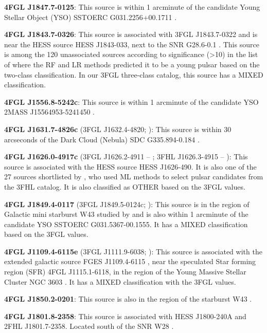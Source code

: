 \documentclass[referee]{aa} %
\begin{document}
\textbf{4FGL J1847.7-0125}: This source is within 1 arcminute of the candidate Young Stellar Object (YSO) SSTOERC G031.2256+00.1711 \citep{2017ApJ...839..108S}.

\textbf{4FGL J1843.7-0326}: This source is associated with 3FGL J1843.7-0322 and is near the HESS source HESS J1843-033, next to the SNR G28.6-0.1 \citep{2018A&A...612A...1H}. This source is
among the 120 unassociated sources according to significance (>10) in the list of \citet{2016ApJ...820....8S} where the RF and LR methods predicted it to be a young pulsar based on the two-class classification. 
In our 3FGL three-class catalog, this source has a MIXED classification.

\textbf{4FGL J1556.8-5242c}: This source is within 1 arcminute of the candidate YSO 2MASS J15564953-5241450 \citep{2008AJ....136.2413R}.

\textbf{4FGL J1631.7-4826c} (3FGL J1632.4-4820; \citealt{2015ApJS..218...23A}): This source is within 30 arcseconds of the Dark Cloud (Nebula) SDC G335.894-0.184 \citep{2016A&A...590A..72P}.

\textbf{4FGL J1626.0-4917c} (3FGL J1626.2-4911 -- \citealt{2015ApJS..218...23A}; 3FHL J1626.3-4915 -- \citealt{2017ApJS..232...18A}): 
This source is associated with the HESS source HESS J1626-490. It is also one of the 27 sources shortlisted by \citet{2020MNRAS.495.1093H}, 
who used ML methods to select pulsar candidates from the 3FHL catalog. It is also classified as OTHER based on the 3FGL values.

\textbf{4FGL J1849.4-0117} (3FGL J1849.5-0124c; \citealt{2015ApJS..218...23A}): This source is in the region of Galactic mini starburst W43 studied by \citet{2020A&A...640A..60Y} and is also within 1 arcminute of the candidate YSO SSTOERC G031.5367-00.1555. It has a MIXED classification based on the 3FGL values.

\textbf{4FGL J1109.4-6115e} (3FGL J1111.9-6038; \citealt{2015ApJS..218...23A}): This source is associated with the extended galactic source FGES J1109.4-6115 \citep{2017ApJ...843..139A}, near the speculated Star forming region (SFR) 4FGL J1115.1-6118, in the region of the Young Massive Stellar Cluster NGC 3603 \citep{2020ApJ...897..131S}. It has a MIXED classification with the 3FGL values.

\textbf{4FGL J1850.2-0201}: This source is also in the region of the starburst W43 \citep{2020A&A...640A..60Y}.

\textbf{4FGL J1801.8-2358}: This source is associated with HESS J1800-240A and 2FHL J1801.7-2358. Located south of the SNR W28 \citep{2020MNRAS.495.2909R}.
\end{document}
